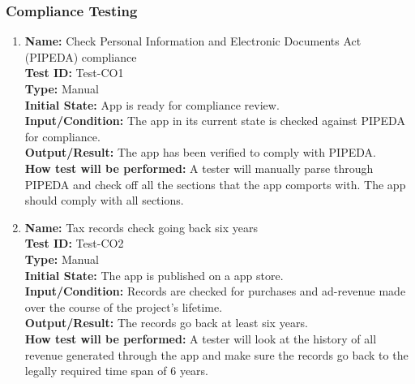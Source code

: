 \documentclass[12pt, titlepage]{article}
\begin{document}
\begin{enumerate}
\begin{enumerate}
\end{enumerate}
\subsubsection{Compliance Testing}

\begin{enumerate}

    \item
    \textbf{Name:} Check Personal Information and Electronic
Documents Act (PIPEDA) \cite{PIPEDA} compliance \label{itm:Test-CO1} \\
    \textbf{Test ID:} Test-CO1 \\
    \textbf{Type:} Manual \\
    \textbf{Initial State:} App is ready for compliance review. \\
    \textbf{Input/Condition:} The app in its current state is checked against PIPEDA for compliance. \\
    \textbf{Output/Result:} The app has been verified to comply with PIPEDA. \\
    \textbf{How test will be performed:} A tester will manually parse through PIPEDA and check off all the sections that the app comports with. The app should comply with all sections.

    \item
    \textbf{Name:} Tax records check going back six years \label{itm:Test-CO2} \\
    \textbf{Test ID:} Test-CO2 \\
    \textbf{Type:} Manual \\
    \textbf{Initial State:} The app is published on a app store. \\
    \textbf{Input/Condition:} Records are checked for purchases and ad-revenue made over the course of the project's lifetime. \\
    \textbf{Output/Result:} The records go back at least six years. \\
    \textbf{How test will be performed:} A tester will look at the history of all revenue generated through the app and make sure the records go back to the legally required time span of 6 years.


\end{enumerate}
\end{enumerate}
\end{document}
